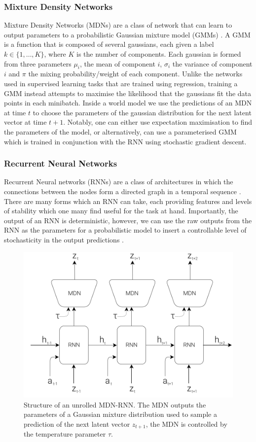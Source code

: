 \subsubsection{Mixture Density Networks}
Mixture Density Networks (MDNs) are a class of network that can learn to output parameters to a probabilistic Gaussian mixture model (GMMs) \cite{bishop1994mixture}. A GMM is a function that is composed of several gaussians, each given a label $k \in \lbrace 1, \ldots, K \rbrace$, where $K$ is the number of components. Each gaussian is formed from three parameters $\mu_i$, the mean of component $i$, $\sigma_i$ the variance of component $i$ and $\pi$ the mixing probability/weight of each component. Unlike the networks used in supervised learning tasks that are trained using regression, training a GMM instead attempts to maximise the likelihood that the gaussians fit the data points in each minibatch. Inside a world model we use the predictions of an MDN at time $t$ to choose the parameters of the gaussian distribution for the next latent vector at time $t+1$. Notably, one can either use expectation maximisation to find the parameters of the model, or alternatively, can use a parameterised GMM which is trained in conjunction with the RNN using stochastic gradient descent.


\subsubsection{Recurrent Neural Networks}
Recurrent Neural networks (RNNs) are a class of architectures in which the connections between the nodes form a directed graph in a temporal sequence \cite{650093}. There are many forms which an RNN can take, each providing features and levels of stability which one many find useful for the task at hand. Importantly, the output of an RNN is deterministic, however, we can use the raw outputs from the RNN as the parameters for a probabilistic model to insert a controllable level of stochasticity in the output predictions \cite{graves2014generating}.

\begin{figure}[ht]
  \centering
  \includegraphics[width=0.75\columnwidth]{sections/4rlopt/images/mdnrnn.png}
  \caption[Temporally unrolled MDN-RNN]{Structure of an unrolled MDN-RNN. The MDN outputs the parameters of a Gaussian mixture distribution used to sample a prediction of the next latent vector $z_{t+1}$, the MDN is controlled by the temperature parameter $\tau$.}
  \label{fig:rl:mdnrnn}
\end{figure}


